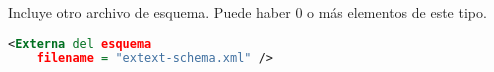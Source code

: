 Incluye otro archivo de esquema. Puede haber 0 o más elementos de este tipo.

\begin{lstlisting}[language=XML]
<Externa del esquema
	filename = "extext-schema.xml" />
\end{lstlisting}